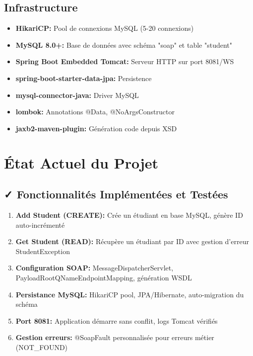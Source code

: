 \documentclass[12pt,a4paper]{report}
\begin{document}
\begin{enumerate}
\begin{itemize}
\begin{itemize}
\subsection{Infrastructure}
\begin{itemize}
    \item \textbf{HikariCP:} Pool de connexions MySQL (5-20 connexions)
    \item \textbf{MySQL 8.0+:} Base de données avec schéma "soap" et table "student"
    \item \textbf{Spring Boot Embedded Tomcat:} Serveur HTTP sur port 8081/WS
    \item \textbf{spring-boot-starter-data-jpa:} Persistence
    \item \textbf{mysql-connector-java:} Driver MySQL
    \item \textbf{lombok:} Annotations @Data, @NoArgsConstructor
    \item \textbf{jaxb2-maven-plugin:} Génération code depuis XSD
\end{itemize}

\vspace{2cm}

\section{État Actuel du Projet}

\subsection{✓ Fonctionnalités Implémentées et Testées}
\begin{enumerate}
    \item \textbf{Add Student (CREATE):} Crée un étudiant en base MySQL, génère ID auto-incrémenté
    \item \textbf{Get Student (READ):} Récupère un étudiant par ID avec gestion d'erreur StudentException
    \item \textbf{Configuration SOAP:} MessageDispatcherServlet, PayloadRootQNameEndpointMapping, génération WSDL
    \item \textbf{Persistance MySQL:} HikariCP pool, JPA/Hibernate, auto-migration du schéma
    \item \textbf{Port 8081:} Application démarre sans conflit, logs Tomcat vérifiés
    \item \textbf{Gestion erreurs:} @SoapFault personnalisée pour erreurs métier (NOT_FOUND)
\end{enumerate}


\end{itemize}
\end{itemize}
\end{enumerate}
\end{document}
